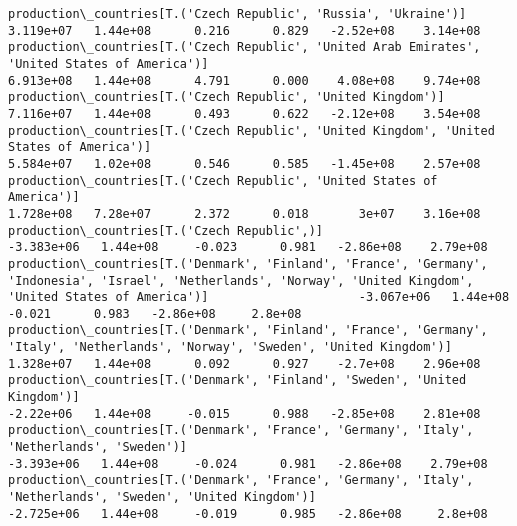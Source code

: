 \documentclass[11pt]{article}
\begin{document}
\begin{Verbatim}[commandchars=\\\{\}]
production\_countries[T.('Czech Republic', 'Russia', 'Ukraine')]                                                                                                                        3.119e+07   1.44e+08      0.216      0.829   -2.52e+08    3.14e+08
production\_countries[T.('Czech Republic', 'United Arab Emirates', 'United States of America')]                                                                                         6.913e+08   1.44e+08      4.791      0.000    4.08e+08    9.74e+08
production\_countries[T.('Czech Republic', 'United Kingdom')]                                                                                                                           7.116e+07   1.44e+08      0.493      0.622   -2.12e+08    3.54e+08
production\_countries[T.('Czech Republic', 'United Kingdom', 'United States of America')]                                                                                               5.584e+07   1.02e+08      0.546      0.585   -1.45e+08    2.57e+08
production\_countries[T.('Czech Republic', 'United States of America')]                                                                                                                 1.728e+08   7.28e+07      2.372      0.018       3e+07    3.16e+08
production\_countries[T.('Czech Republic',)]                                                                                                                                           -3.383e+06   1.44e+08     -0.023      0.981   -2.86e+08    2.79e+08
production\_countries[T.('Denmark', 'Finland', 'France', 'Germany', 'Indonesia', 'Israel', 'Netherlands', 'Norway', 'United Kingdom', 'United States of America')]                     -3.067e+06   1.44e+08     -0.021      0.983   -2.86e+08     2.8e+08
production\_countries[T.('Denmark', 'Finland', 'France', 'Germany', 'Italy', 'Netherlands', 'Norway', 'Sweden', 'United Kingdom')]                                                      1.328e+07   1.44e+08      0.092      0.927    -2.7e+08    2.96e+08
production\_countries[T.('Denmark', 'Finland', 'Sweden', 'United Kingdom')]                                                                                                             -2.22e+06   1.44e+08     -0.015      0.988   -2.85e+08    2.81e+08
production\_countries[T.('Denmark', 'France', 'Germany', 'Italy', 'Netherlands', 'Sweden')]                                                                                            -3.393e+06   1.44e+08     -0.024      0.981   -2.86e+08    2.79e+08
production\_countries[T.('Denmark', 'France', 'Germany', 'Italy', 'Netherlands', 'Sweden', 'United Kingdom')]                                                                          -2.725e+06   1.44e+08     -0.019      0.985   -2.86e+08     2.8e+08

\end{Verbatim}
\end{document}
